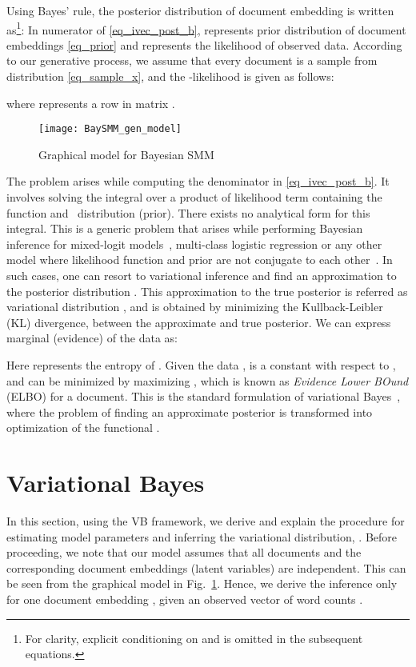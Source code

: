 \documentclass[journal]{IEEEtran}
\newcommand{\Gau}{}
\begin{document}
Using Bayes' rule, the posterior distribution of document embedding  
is written as\footnote{For clarity, explicit conditioning on  and 
 is omitted in the subsequent equations.}: 
In numerator of \eqref{eq_ivec_post_b},  represents prior 
distribution of document embeddings \eqref{eq_prior} 
and  represents the likelihood of observed data. 
According to our generative process, we assume that every document  
is a sample from  distribution \eqref{eq_sample_x}, 
and the -likelihood is given as follows:

where  represents a row in matrix .
\begin{figure}[t!]
  \centering
  \captionsetup{justification=centering}
	\texttt{[image: BaySMM\_gen\_model]}
  \caption{\label{fig:baysmm} Graphical model for Bayesian SMM}
\end{figure}
The problem arises while computing the denominator in \eqref{eq_ivec_post_b}. 
It involves solving the integral over a product of likelihood term containing 
the  function and \Gau~distribution (prior). There exists 
no analytical form for this integral. This is a generic problem that arises 
while performing Bayesian inference for mixed-logit 
models~\cite{Blei:2005:CTM,Depraetere:2017:mixed}, multi-class 
logistic regression or any other model where likelihood function and prior are 
not conjugate to each other~\cite{Bishop:2006:PRML}. In such cases, one can 
resort to variational inference and find an approximation to the posterior 
distribution . This approximation to the true posterior 
is referred as variational distribution , and is obtained by 
minimizing the Kullback-Leibler (KL) divergence,  between 
the approximate and true posterior. We can express  marginal (evidence) 
of the data as:

Here  represents the entropy of .
Given the data ,  is a constant with respect to , and  can be minimized by maximizing , which is known as \textit{Evidence Lower BOund}  (ELBO) for a document. This is the standard formulation of variational Bayes~\cite{Bishop:2006:PRML}, where the problem of finding an approximate posterior is transformed into optimization of the functional .
\section{Variational Bayes}
\label{sec:vi}
In this section, using the VB framework, we derive and explain the procedure 
for estimating model parameters  and inferring the 
variational distribution, . Before proceeding, we note that our 
model assumes that all documents and the corresponding document embeddings 
(latent variables) are independent. This can be seen from the graphical model 
in Fig.~\ref{fig:baysmm}. Hence, we derive the inference only for one document 
embedding , given an observed vector of word counts .
\end{document}
